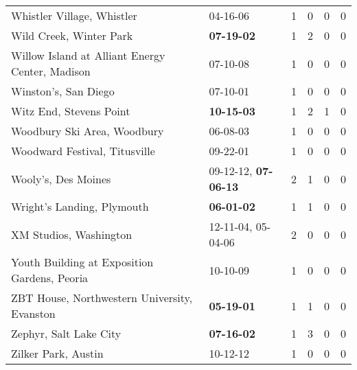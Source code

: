 \begin{longtable}{p{}p{}p{}p{}p{}p{}}
                                                   Whistler Village, Whistler &                                                04-16-06\textsuperscript{} &  1 &  0 &  0 &  0 \\
                                                      Wild Creek, Winter Park &                                       \textbf{07-19-02\textsuperscript{}} &  1 &  2 &  0 &  0 \\
                              Willow Island at Alliant Energy Center, Madison &                                                07-10-08\textsuperscript{} &  1 &  0 &  0 &  0 \\
                                                         Winston's, San Diego &                                                07-10-01\textsuperscript{} &  1 &  0 &  0 &  0 \\
                                                      Witz End, Stevens Point &                                       \textbf{10-15-03\textsuperscript{}} &  1 &  2 &  1 &  0 \\
                                                  Woodbury Ski Area, Woodbury &                                                06-08-03\textsuperscript{} &  1 &  0 &  0 &  0 \\
                                                Woodward Festival, Titusville &                                                09-22-01\textsuperscript{} &  1 &  0 &  0 &  0 \\
                                                          Wooly's, Des Moines &           09-12-12\textsuperscript{}, \textbf{07-06-13\textsuperscript{}} &  2 &  1 &  0 &  0 \\
                                                   Wright's Landing, Plymouth &                                       \textbf{06-01-02\textsuperscript{}} &  1 &  1 &  0 &  0 \\
                                                       XM Studios, Washington &                    12-11-04\textsuperscript{}, 05-04-06\textsuperscript{} &  2 &  0 &  0 &  0 \\
                                 Youth Building at Exposition Gardens, Peoria &                                                10-10-09\textsuperscript{} &  1 &  0 &  0 &  0 \\
                                 ZBT House, Northwestern University, Evanston &                                       \textbf{05-19-01\textsuperscript{}} &  1 &  1 &  0 &  0 \\
                                                       Zephyr, Salt Lake City &                                       \textbf{07-16-02\textsuperscript{}} &  1 &  3 &  0 &  0 \\
                                                          Zilker Park, Austin &                                                10-12-12\textsuperscript{} &  1 &  0 &  0 &  0 \\
\end{longtable}

